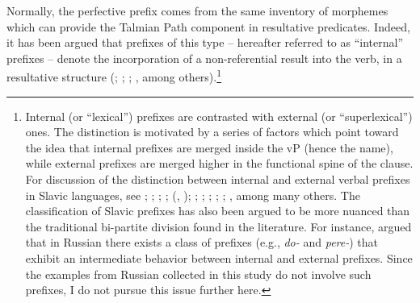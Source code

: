 \documentclass[output=paper,colorlinks,citecolor=brown]{langscibook}
\begin{document}
\noindent Normally, the perfective prefix comes from the same inventory of morphemes which can provide the Talmian Path component in resultative predicates. Indeed, it has been argued that prefixes of this type -- hereafter referred to as ``internal'' prefixes -- denote the incorporation of a non-referential result into the verb, in a resultative structure (\citealt{RamchandAndSvenonius2002}; \citealt{big:Gehrke2008}; \citealt{Acedo-Matellan2016}; \citealt{big:Kwapiszewski2022}, among others).\footnote{Internal (or ``lexical'') prefixes are contrasted with external (or ``superlexical'') ones. The distinction is motivated by a series of factors which point toward the idea that internal prefixes are merged inside the vP (hence the name), while external prefixes are merged higher in the functional spine of the clause. For discussion of the distinction between internal and external verbal prefixes in Slavic languages, see \citet{BabkoMalaya1999}; \citet{big:Romanova2004}; \citet{big:Svenonius2004}; \citet{big:Borik2006}; \citeauthor{Arsenijević2006} (\citeyear{Arsenijević2006}, \citeyear{Arsenijević2007}); \citet{big:Gehrke2008}; \citet{Zaucer2009}; \citet{big:Lazorczyk2010}; \citet{big:Tatevosov2011}; \citet{big:Milosavljevic2022}; \citet{big:Kwapiszewski2022}, among many others. The classification of Slavic prefixes has also been argued to be more nuanced than the traditional bi-partite division found in the literature. For instance, \citet{big:Tatevosov2008} argued that in Russian there exists a class of prefixes (e.g., \textit{do-} and \textit{pere-}) that exhibit an intermediate behavior between internal and external prefixes. %
Since the examples from Russian collected in this study do not involve such prefixes, I do not pursue this issue further here. %
} %
%
\end{document}

